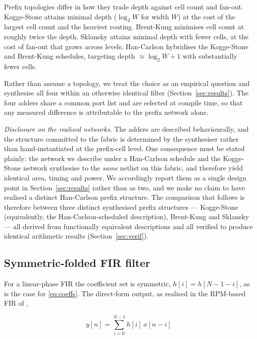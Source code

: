 \documentclass[conference]{IEEEtran}
\begin{document}
Prefix topologies differ in how they trade depth against cell count and
fan-out. Kogge-Stone attains minimal depth ($\log_2 W$ for width $W$) at
the cost of the largest cell count and the heaviest routing. Brent-Kung
minimises cell count at roughly twice the depth. Sklansky attains
minimal depth with fewer cells, at the cost of fan-out that grows across
levels. Han-Carlson hybridises the Kogge-Stone and Brent-Kung schedules,
targeting depth $\approx \log_2 W + 1$ with substantially fewer cells.

Rather than assume a topology, we treat the choice as an empirical
question and synthesise all four within an otherwise identical filter
(Section~\ref{sec:results}). The four adders share a common port list
and are selected at compile time, so that any measured difference is
attributable to the prefix network alone.

\smallskip\noindent\textit{Disclosure on the realised networks.} The
adders are described behaviourally, and the structure committed to the
fabric is determined by the synthesiser rather than hand-instantiated at
the prefix-cell level. One consequence must be stated plainly: the
network we describe under a Han-Carlson schedule and the Kogge-Stone
network synthesise to the \emph{same} netlist on this fabric, and
therefore yield identical area, timing and power. We accordingly report
them as a single design point in Section~\ref{sec:results} rather than
as two, and we make no claim to have realised a distinct Han-Carlson
prefix structure. The comparison that follows is therefore between three
distinct synthesised prefix structures --- Kogge-Stone (equivalently, the
Han-Carlson-scheduled description), Brent-Kung and Sklansky --- all
derived from functionally equivalent descriptions and all verified to
produce identical arithmetic results (Section~\ref{sec:verif}).

\subsection{Symmetric-folded FIR filter}
\label{subsec:fold}

For a linear-phase FIR the coefficient set is symmetric,
$h[i] = h[N-1-i]$, as is the case for \eqref{eq:coeffs}. The direct-form
output, as realised in the RPM-based FIR of \cite{gunasekaran},

\begin{equation}
y[n] = \sum_{i=0}^{N-1} h[i]\, x[n-i]
\label{eq:direct}
\end{equation}
\end{document}
